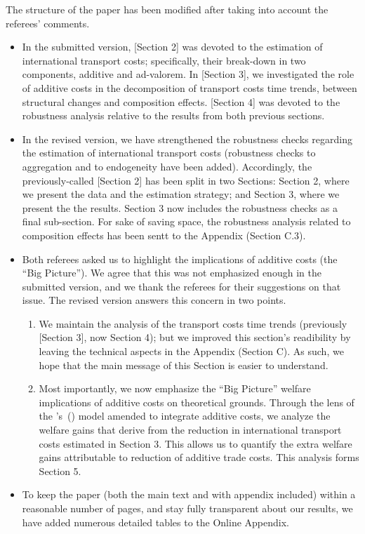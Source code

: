 \documentclass[a4paper,11pt]{article}
\newcommand\cites[1]{\citeauthor{#1}'s\ (\citeyear{#1})}
\begin{document}
The structure of the paper has been modified after taking into account the referees' comments.
\begin{itemize}
\item In the submitted version, [Section 2] was devoted to the estimation of international transport costs; specifically, their break-down in two components, additive and ad-valorem. In [Section 3], we investigated the role of additive costs in the decomposition of transport costs time trends, between structural changes and composition effects. [Section 4] was devoted to the robustness analysis relative to the results from both previous sections.
\item In the revised version, we have strengthened the robustness checks regarding the estimation of international transport costs (robustness checks to aggregation and to endogeneity have been added). Accordingly, the previously-called [Section 2] has been split in two Sections: Section 2, where we present the data and the estimation strategy; and Section 3, where we present the the results. Section 3 now includes the robustness checks as a final sub-section. For sake of saving space, the robustness analysis related to composition effects has been sentt to the Appendix (Section C.3).
\item Both referees asked us to highlight the implications of additive costs (the ``Big Picture''). We agree that this was not emphasized enough in the submitted version, and we thank the referees for their suggestions on that issue. The revised version answers this concern in two points.
    \begin{enumerate}
    \item We maintain the analysis of the transport costs time trends (previously [Section 3], now Section 4); but we improved this section’s readibility by leaving the technical aspects in the Appendix (Section C). As such, we hope that the main message of this Section is easier to understand.
    \item Most importantly, we now emphasize the ``Big Picture'' welfare implications of additive costs on theoretical grounds. Through the lens of the \cites{melitz} model amended to integrate additive costs, we analyze the welfare gains that derive from the reduction in international transport costs estimated in Section 3. This allows us to quantify the extra welfare gains attributable to reduction of additive trade costs. This analysis forms Section 5.
        \end{enumerate}
\item To keep the paper (both the main text and with appendix included) within a reasonable number of pages, and stay fully transparent about our results, we have added numerous detailed tables to the Online Appendix.
\end{itemize}
\end{document}
